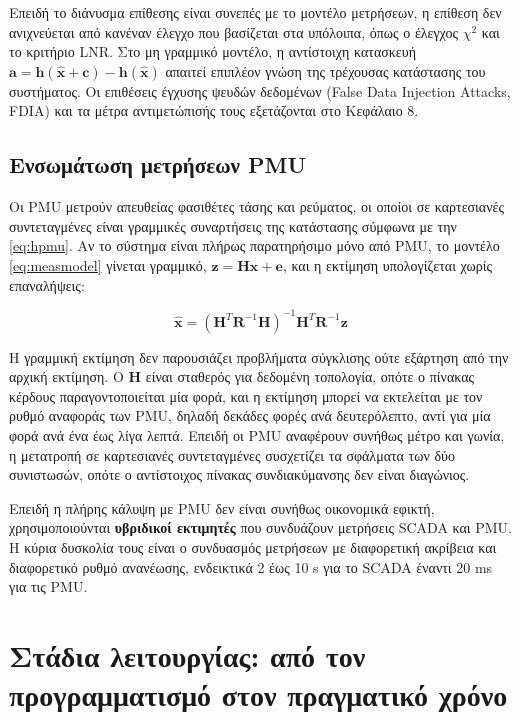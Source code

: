 Επειδή το διάνυσμα επίθεσης είναι συνεπές με το μοντέλο μετρήσεων, η επίθεση δεν
ανιχνεύεται από κανέναν έλεγχο που βασίζεται στα υπόλοιπα, όπως ο έλεγχος $\chi^2$ και το
κριτήριο LNR. Στο μη γραμμικό μοντέλο, η αντίστοιχη κατασκευή
$\mathbf{a} = \mathbf{h}(\hat{\mathbf{x}} + \mathbf{c}) - \mathbf{h}(\hat{\mathbf{x}})$
απαιτεί επιπλέον γνώση της τρέχουσας κατάστασης του συστήματος. Οι επιθέσεις έγχυσης ψευδών
δεδομένων (False Data Injection Attacks, FDIA) και τα μέτρα αντιμετώπισής τους εξετάζονται
στο Κεφάλαιο 8.

\subsection{Ενσωμάτωση μετρήσεων PMU}

Οι PMU μετρούν απευθείας φασιθέτες τάσης και ρεύματος, οι οποίοι σε καρτεσιανές συντεταγμένες
είναι γραμμικές συναρτήσεις της κατάστασης σύμφωνα με την \eqref{eq:hpmu}. Αν το σύστημα είναι
πλήρως παρατηρήσιμο μόνο από PMU, το μοντέλο \eqref{eq:measmodel} γίνεται γραμμικό,
$\mathbf{z} = \mathbf{H}\mathbf{x} + \mathbf{e}$, και η εκτίμηση υπολογίζεται χωρίς
επαναλήψεις:

\begin{equation}
\hat{\mathbf{x}} = \left(\mathbf{H}^{T}\mathbf{R}^{-1}\mathbf{H}\right)^{-1}
                    \mathbf{H}^{T}\mathbf{R}^{-1}\mathbf{z}
\label{eq:linse}
\end{equation}

Η γραμμική εκτίμηση δεν παρουσιάζει προβλήματα σύγκλισης ούτε εξάρτηση από την αρχική
εκτίμηση. Ο $\mathbf{H}$ είναι σταθερός για δεδομένη τοπολογία, οπότε ο πίνακας κέρδους
παραγοντοποιείται μία φορά, και η εκτίμηση μπορεί να εκτελείται με τον ρυθμό αναφοράς των
PMU, δηλαδή δεκάδες φορές ανά δευτερόλεπτο, αντί για μία φορά ανά ένα έως λίγα λεπτά. Επειδή
οι PMU αναφέρουν συνήθως μέτρο και γωνία, η μετατροπή σε καρτεσιανές συντεταγμένες συσχετίζει
τα σφάλματα των δύο συνιστωσών, οπότε ο αντίστοιχος πίνακας συνδιακύμανσης δεν είναι
διαγώνιος.

Επειδή η πλήρης κάλυψη με PMU δεν είναι συνήθως οικονομικά εφικτή, χρησιμοποιούνται
\textbf{υβριδικοί εκτιμητές} που συνδυάζουν μετρήσεις SCADA και PMU. Η κύρια δυσκολία τους
είναι ο συνδυασμός μετρήσεων με διαφορετική ακρίβεια και διαφορετικό ρυθμό ανανέωσης,
ενδεικτικά 2 έως 10 s για το SCADA έναντι 20 ms για τις PMU.

\section{Στάδια λειτουργίας: από τον προγραμματισμό στον πραγματικό χρόνο}

